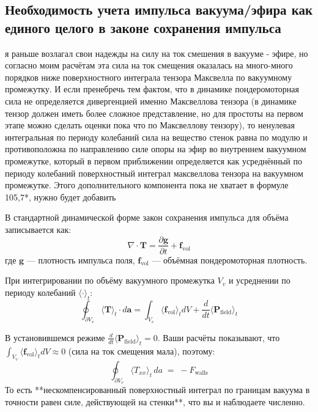 \documentclass[a4paper,10pt]{article}
\newcommand{\modblock}[1]{\colorbox{modcolor!10}{\parbox{\dimexpr\linewidth-2\fboxsep}{#1}}}
\begin{document}


\modblock{

\section{Необходимость учета импульса вакуума/эфира как единого целого в законе сохранения импульса }
\label{sec:momentum_balance}

 я раньше возлагал свои надежды на силу на ток смешения в вакууме - эфире, но согласно моим расчётам эта сила на ток смещения оказалась на много-много порядков ниже поверхностного интеграла тензора Максвелла по вакуумному промежутку. И если пренебречь тем фактом, что в динамике пондеромоторная сила не определяется дивергенцией именно Максвеллова тензора (в динамике тензор должен иметь более сложное представление, но для простоты на первом этапе можно сделать оценки пока что по Максвеллову тензору), то ненулевая интегральная по периоду колебаний сила на вещество стенок равна по модулю и противоположна по направлению силе опоры на эфир во внутреннем вакуумном промежутке, который в первом приближении определяется как усреднённый по периоду колебаний поверхностный интеграл максвеллова тензора на вакуумном промежутке. Этого дополнительного компонента пока не хватает в формуле 105,7*, нужно будет добавить

В стандартной динамической форме закон сохранения импульса для объёма записывается как:
$$\nabla \cdot \mathbf{T} = \frac{\partial \mathbf{g}}{\partial t} + \mathbf{f}_{\text{vol}}$$
где $\mathbf{g}$ — плотность импульса поля, $\mathbf{f}_{\text{vol}}$ — объёмная пондеромоторная плотность.

При интегрировании по объёму вакуумного промежутка $V_v$ и усреднении по периоду колебаний $\langle \cdot \rangle_t$:
$$\oint_{\partial V_v} \langle \mathbf{T} \rangle_t \cdot d\mathbf{a} = \int_{V_v} \langle \mathbf{f}_{\text{vol}} \rangle_t dV + \frac{d}{dt} \langle \mathbf{P}_{\text{field}} \rangle_t$$

В установившемся режиме $\frac{d}{dt} \langle \mathbf{P}_{\text{field}} \rangle_t = 0$. Ваши расчёты показывают, что $\int_{V_v} \langle \mathbf{f}_{\text{vol}} \rangle_t dV \approx 0$ (сила на ток смещения мала), поэтому:
$$\boxed{ \oint_{\partial V_v} \langle T_{xx} \rangle_t \, da \;=\; - F_{\text{walls}} }$$
То есть **нескомпенсированный поверхностный интеграл по границам вакуума в точности равен силе, действующей на стенки**, что вы и наблюдаете численно.

}
\end{document}
